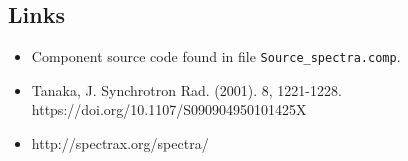 \subsection*{Links}
\begin{itemize}
  \item Component source code found in file \texttt{Source\_spectra.comp}.
  \item Tanaka, J. Synchrotron Rad. (2001). 8, 1221-1228. https://doi.org/10.1107/S090904950101425X
  \item http://spectrax.org/spectra/
\end{itemize}
